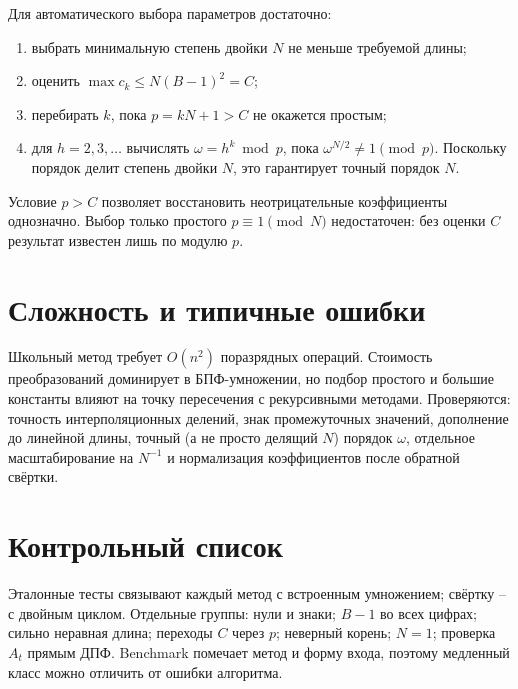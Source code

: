 \documentclass[12pt]{ca-capstone}
\begin{document}
Для автоматического выбора параметров достаточно:
\begin{enumerate}
  \item выбрать минимальную степень двойки $N$ не меньше требуемой длины;
  \item оценить $\max c_k\le N(B-1)^2=C$;
  \item перебирать $k$, пока $p=kN+1>C$ не окажется простым;
  \item для $h=2,3,\ldots$ вычислять $\omega=h^k\bmod p$, пока
    $\omega^{N/2}\ne1\pmod p$. Поскольку порядок делит степень двойки $N$, это гарантирует
    точный порядок $N$.
\end{enumerate}
Условие $p>C$ позволяет восстановить неотрицательные коэффициенты однозначно. Выбор только
простого $p\equiv1\pmod N$ недостаточен: без оценки $C$ результат известен лишь по модулю $p$.

\section{Сложность и типичные ошибки}
Школьный метод требует $O(n^2)$ поразрядных операций. Стоимость преобразований доминирует в
БПФ-умножении, но подбор простого и большие константы влияют на точку пересечения с рекурсивными
методами. Проверяются: точность интерполяционных делений, знак промежуточных значений, дополнение
до линейной длины, точный (а не просто делящий $N$) порядок $\omega$, отдельное масштабирование
на $N^{-1}$ и нормализация коэффициентов после обратной свёртки.

\clearpage
\section{Контрольный список}
Эталонные тесты связывают каждый метод с встроенным умножением; свёртку --с двойным циклом.
Отдельные группы: нули и знаки; $B-1$ во всех цифрах; сильно неравная длина; переходы $C$ через
$p$; неверный корень; $N=1$; проверка $A_t$ прямым ДПФ. Benchmark помечает метод и форму входа,
поэтому медленный класс можно отличить от ошибки алгоритма.

\end{document}
